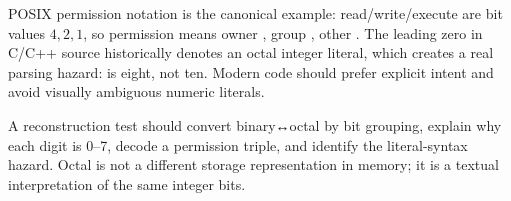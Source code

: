 POSIX permission notation is the canonical example: read/write/execute are bit values \(4,2,1\), so permission  means owner , group , other . The leading zero in C/C++ source historically denotes an octal integer literal, which creates a real parsing hazard:  is eight, not ten. Modern code should prefer explicit intent and avoid visually ambiguous numeric literals.

A reconstruction test should convert binary↔octal by bit grouping, explain why each digit is 0--7, decode a permission triple, and identify the literal-syntax hazard. Octal is not a different storage representation in memory; it is a textual interpretation of the same integer bits.
